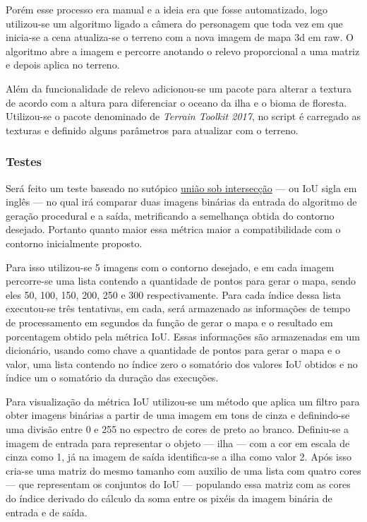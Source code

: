  Porém esse processo era manual e a ideia era que fosse automatizado, logo utilizou-se um algoritmo ligado a câmera do personagem que toda vez em que inicia-se a cena atualiza-se o terreno com a nova imagem de mapa 3d em raw. O algoritmo abre a imagem e percorre anotando o relevo proporcional a uma matriz e depois aplica no terreno.

 Além da funcionalidade de relevo adicionou-se um pacote para alterar a textura de acordo com a altura para diferenciar o oceano da ilha e o bioma de floresta. Utilizou-se o pacote denominado de \textit{Terrain Toolkit 2017}, no script é carregado as texturas e definido alguns parâmetros para atualizar com o terreno.

\subsubsection{Testes}

Será feito um teste baseado no sutópico \hyperref[sec:uniaoSobInterseccao]{união sob intersecção} — ou IoU sigla em inglês — no qual irá comparar duas imagens binárias da entrada do algoritmo de geração procedural e a saída, metrificando a semelhança obtida do contorno desejado. Portanto quanto maior essa métrica maior a compatibilidade com o contorno inicialmente proposto.

Para isso utilizou-se 5 imagens com o contorno desejado, e em cada imagem percorre-se uma lista contendo a quantidade de pontos para gerar o mapa, sendo eles 50, 100, 150, 200, 250 e 300 respectivamente. Para cada índice dessa lista executou-se três tentativas, em cada, será armazenado as informações de tempo de processamento em segundos da função de gerar o mapa e o resultado em porcentagem obtido pela métrica IoU. Essas informações são armazenadas em um dicionário, usando como chave a quantidade de pontos para gerar o mapa e o valor, uma lista contendo no índice zero o somatório dos valores IoU obtidos e no índice um o somatório da duração das execuções.

Para visualização da métrica IoU utilizou-se um método que aplica um filtro para obter imagens binárias a partir de uma imagem em tons de cinza e definindo-se uma divisão entre 0 e 255 no espectro de cores de preto ao branco. Definiu-se a imagem de entrada para representar o objeto — ilha — com a cor em escala de cinza como 1, já na imagem de saída identifica-se a ilha como valor 2. Após isso cria-se uma matriz do mesmo tamanho com auxilio de uma lista com quatro cores — que representam os conjuntos do IoU — populando essa matriz com as cores do índice derivado do cálculo da soma entre os pixéis da imagem binária de entrada e de saída.

